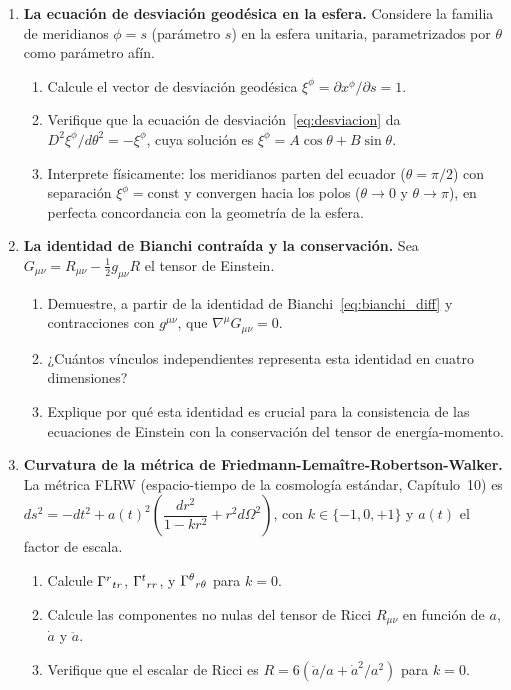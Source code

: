 \begin{enumerate}[leftmargin=2em, label=\textbf{P\thechapter.\arabic*.}]
  \item \textbf{La ecuación de desviación geodésica en la esfera.}
  Considere la familia de meridianos $\phi = s$ (parámetro $s$) en la esfera unitaria, parametrizados por $\theta$ como parámetro afín.
  \begin{enumerate}[label=(\alph*)]
    \item Calcule el vector de desviación geodésica $\xi^\phi = \partial x^\phi/\partial s = 1$.
    \item Verifique que la ecuación de desviación~\eqref{eq:desviacion} da $D^2\xi^\phi/d\theta^2 = -\xi^\phi$, cuya solución es $\xi^\phi = A\cos\theta + B\sin\theta$.
    \item Interprete físicamente: los meridianos parten del ecuador ($\theta = \pi/2$) con separación $\xi^\phi = \text{const}$ y convergen hacia los polos ($\theta \to 0$ y $\theta \to \pi$), en perfecta concordancia con la geometría de la esfera.
  \end{enumerate}

  \item \textbf{La identidad de Bianchi contraída y la conservación.}
  Sea $G_{\mu\nu} = R_{\mu\nu} - \tfrac{1}{2}g_{\mu\nu}R$ el tensor de Einstein.
  \begin{enumerate}[label=(\alph*)]
    \item Demuestre, a partir de la identidad de Bianchi~\eqref{eq:bianchi_diff} y contracciones con $g^{\mu\nu}$, que $\nabla^\mu G_{\mu\nu} = 0$.
    \item ¿Cuántos vínculos independientes representa esta identidad en cuatro dimensiones?
    \item Explique por qué esta identidad es crucial para la consistencia de las ecuaciones de Einstein con la conservación del tensor de energía-momento.
  \end{enumerate}

  \item \textbf{Curvatura de la métrica de Friedmann-Lemaître-Robertson-Walker.}
  La métrica FLRW (espacio-tiempo de la cosmología estándar, Capítulo~10) es
  $ds^2 = -dt^2 + a(t)^2\!\left(\dfrac{dr^2}{1-kr^2} + r^2 d\Omega^2\right)$,
  con $k \in \{-1, 0, +1\}$ y $a(t)$ el factor de escala.
  \begin{enumerate}[label=(\alph*)]
    \item Calcule $\Gamma^{r}{}_{t r}$, $\Gamma^{t}{}_{r r}$, y $\Gamma^{\theta}{}_{r \theta}$ para $k = 0$.
    \item Calcule las componentes no nulas del tensor de Ricci $R_{\mu\nu}$ en función de $a$, $\dot{a}$ y $\ddot{a}$.
    \item Verifique que el escalar de Ricci es $R = 6\left(\ddot{a}/a + \dot{a}^2/a^2\right)$ para $k=0$.
  \end{enumerate}


\end{enumerate}

